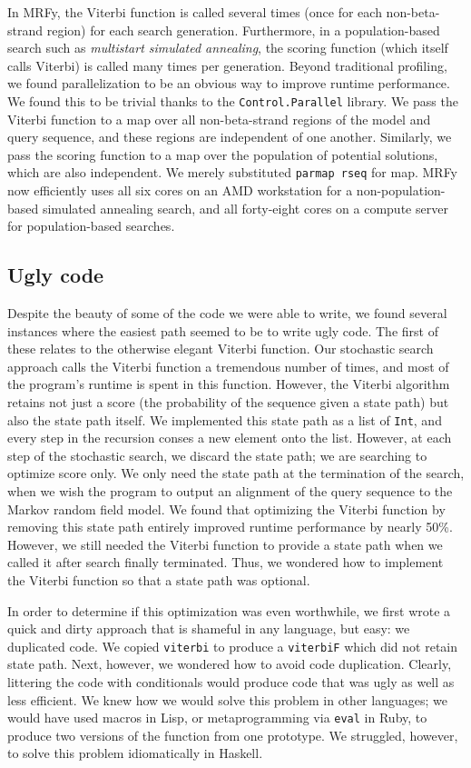 \documentclass[preprint]{sigplanconf}
\begin{document}
In MRFy, the Viterbi function is called several times (once for each 
non-beta-strand region) for each search generation. Furthermore, in a 
population-based search such as \textit{multistart simulated annealing}, the 
scoring function (which itself calls Viterbi) is called many times per 
generation. Beyond traditional profiling, we found parallelization to be an 
obvious way to improve runtime performance. We found this to be trivial thanks 
to the \texttt{Control.Parallel} library. We pass the Viterbi function to a map over all 
non-beta-strand regions of the model and query sequence, and these regions are 
independent of one another. Similarly, we pass the scoring function to a map 
over the population of potential solutions, which are also independent. We 
merely substituted \texttt{parmap rseq} for map. MRFy now efficiently uses all six 
cores on an AMD workstation for a non-population-based simulated annealing 
search, and all forty-eight cores on a compute server for population-based 
searches.


\subsection{Ugly code}

Despite the beauty of some of the code we were able to write, we found several 
instances where the easiest path seemed to be to write ugly code. The first of 
these relates to the otherwise elegant Viterbi function. Our stochastic search 
approach calls the Viterbi function a tremendous number of times, and most of 
the program's runtime is spent in this function. However, the Viterbi algorithm 
retains not just a score (the probability of the sequence given a state path) 
but also the state path itself. We implemented this state path as a list of 
\texttt{Int}, and every step in the recursion conses a new element onto the 
list. However, at each step of the stochastic search, we discard the state 
path; we are searching to optimize score only. We only need the state path at 
the termination of the search, when we wish the program to output an alignment 
of the query sequence to the Markov random field model. We found that 
optimizing the Viterbi function by removing this state path entirely improved 
runtime performance by nearly 50\%. However, we still needed the Viterbi 
function to provide a state path when we called it after search finally 
terminated. Thus, we wondered how to implement the Viterbi function so that a 
state path was optional.

In order to determine if this optimization was even worthwhile, we first wrote 
a quick and dirty approach that is shameful in any language, but easy: we 
duplicated code. We copied \texttt{viterbi} to produce a \texttt{viterbiF} 
which did not retain state path. Next, however, we wondered how to avoid code 
duplication. Clearly, littering the code with conditionals would produce code 
that was ugly as well as less efficient. We knew how we would solve this 
problem in other languages; we would have used macros in Lisp, or 
metaprogramming via \texttt{eval} in Ruby, to produce two versions of the 
function from one prototype. We struggled, however, to solve this problem 
idiomatically in Haskell.
\end{document}
